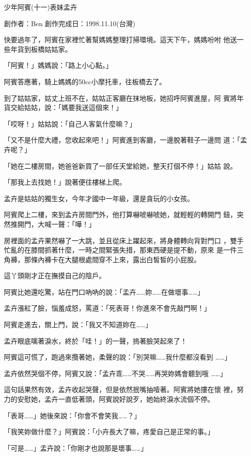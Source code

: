 



少年阿賓(十一)表妹孟卉

創作者：Ben
創作完成日：1998.11.10(台灣)


快要過年了，阿賓在家裡忙著幫媽媽整理打掃環境。這天下午，媽媽吩咐
他送一些年貨到板橋姑姑家。

「阿賓！」媽媽說：「路上小心點。」

阿賓答應著，騎上媽媽的50cc小摩托車，往板橋去了。

到了姑姑家，姑丈上班不在，姑姑正客廳在抹地板，她招呼阿賓進屋，阿
賓將年貨交給姑姑，說：「媽要我送這個來！」

「哎呀！」姑姑說：「自己人客氣什麼嘛？」

「又不是什麼大禮，您收起來吧！」阿賓進到客廳，一邊脫著鞋子一邊問
道：「孟卉呢？」

「她在二樓房間，她爸爸新買了一部任天堂給她，整天打個不停！」姑姑
說。

「那我上去找她！」說著便往樓梯上爬。

孟卉是姑姑的獨生女，今年才國中一年級，還是貪玩的小女孩。

阿賓爬上二樓，來到孟卉房間門外，他打算嚇唬嚇唬她，就輕輕的轉開門
鈕，突然推開門，大喊一聲：「嘩！」

房裡面的孟卉果然嚇了一大跳，並且從床上躍起來，將身體轉向背對門口
，雙手忙亂的在膝間抓著什麼，一時之間緊張失措，那東西硬是提不動，原來
是一件三角褲，那條內褲卡在大腿根處間穿不上來，露出白皙皙的小屁股。

這丫頭剛才正在撫摸自己的陰戶。

阿賓比她還吃驚，站在門口吶吶的說：「孟卉……妳……在做壞事……」

孟卉漲紅了臉，惱羞成怒，罵道：「死表哥！你進來不會先敲門啊！」

阿賓走進去，關上門，說：「我又不知道妳在……」

孟卉眼底噙著淚水，終於「哇！」的一聲，摀著臉哭起來了！

阿賓這可慌了，跑過來攬著她，柔聲的說：「別哭嘛……我什麼都沒看到
……」

孟卉依然哭個不停，阿賓又說：「孟卉乖……不哭……再哭妳媽會聽到哦
……」

這句話果然有效，孟卉收起哭聲，但是依然抿嘴抽噎著。阿賓將她摟在懷
裡，努力的安慰她，孟卉一直低著頭，阿賓說好說歹，她始終淚水流個不停。

「表哥……」她後來說：「你會不會笑我……？」

「我笑妳做什麼？」阿賓說：「小卉長大了嘛，疼愛自己是正常的事。」

「可是……」孟卉說：「你剛才也說那是壞事……」

